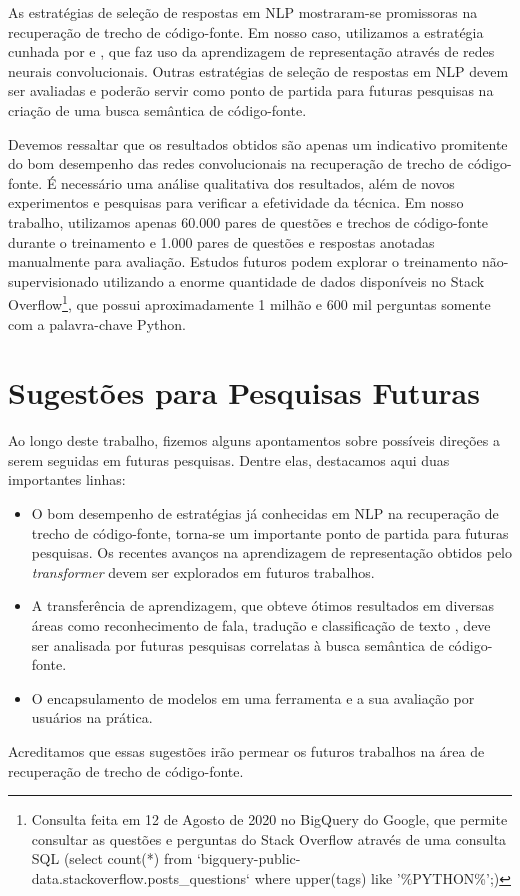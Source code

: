 As estratégias de seleção de respostas em NLP mostraram-se promissoras na recuperação de trecho de código-fonte. Em nosso caso, utilizamos a estratégia cunhada por \cite{feng-2015} e \cite{tan-lstm-qa}, que faz uso da aprendizagem de representação através de redes neurais convolucionais. Outras estratégias de seleção de respostas em NLP devem ser avaliadas e poderão servir como ponto de partida para futuras pesquisas na criação de uma busca semântica de código-fonte.

Devemos ressaltar que os resultados obtidos são apenas um indicativo promitente do bom desempenho das redes convolucionais na recuperação de trecho de código-fonte. É necessário uma análise qualitativa dos resultados, além de novos experimentos e pesquisas para verificar a efetividade da técnica. Em nosso trabalho, utilizamos apenas 60.000 pares de questões e trechos de código-fonte durante o treinamento e 1.000 pares de questões e respostas anotadas manualmente para avaliação. Estudos futuros podem explorar o treinamento não-supervisionado utilizando a enorme quantidade de dados disponíveis no Stack Overflow\footnote{Consulta feita em 12 de Agosto de 2020 no BigQuery do Google, que permite consultar as questões e perguntas do Stack Overflow através de uma consulta SQL (select count(*) from `bigquery-public-data.stackoverflow.posts\_questions` where upper(tags) like '\%PYTHON\%';)}, que possui aproximadamente 1 milhão e 600 mil perguntas somente com a palavra-chave Python.



\section{Sugestões para Pesquisas Futuras} 

Ao longo deste trabalho, fizemos alguns apontamentos sobre possíveis direções a serem seguidas em futuras pesquisas. Dentre elas, destacamos aqui duas importantes linhas:

\begin{itemize}
    \item O bom desempenho de estratégias já conhecidas em NLP na recuperação de trecho de código-fonte, torna-se um importante ponto de partida para futuras pesquisas. Os recentes avanços na aprendizagem de representação obtidos pelo \textit{transformer} devem ser explorados em futuros trabalhos. 
    \item  A transferência de aprendizagem, que obteve ótimos resultados em diversas áreas como reconhecimento de fala, tradução e classificação de texto \cite{devlin-etal-2019-bert}, deve ser analisada por futuras pesquisas correlatas à busca semântica de código-fonte.
    \item O encapsulamento de modelos em uma ferramenta e a sua avaliação por usuários na prática.
\end{itemize}

Acreditamos que essas sugestões irão permear os futuros trabalhos na área de recuperação de trecho de código-fonte. 
